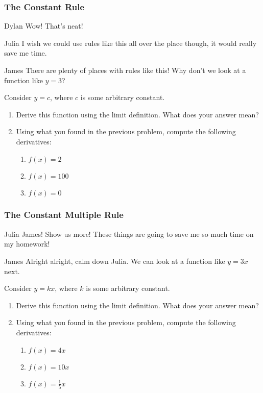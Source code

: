 \documentclass{ximera}
\begin{document}
\subsubsection{The Constant Rule}
\begin{dialogue}
\item[Dylan] Wow! That's neat!
\item[Julia] I wish we could use rules like this all over the place though, it would really save me time.
\item[James] There are plenty of places with rules like this! Why don't we look at a function like $y = 3$?
\end{dialogue}
Consider $y = c$, where $c$ is some arbitrary constant.
\begin{enumerate}
\item{Derive this function using the limit definition. What does your answer mean?}
\item{Using what you found in the previous problem, compute the following derivatives:
\begin{enumerate}
\item{$f(x)=2$}
\item{$f(x)=100$}
\item{$f(x)=0$}
\end{enumerate}
}
\end{enumerate}

\subsubsection{The Constant Multiple Rule}
\begin{dialogue}
\item[Julia] James! Show us more! These things are going to save me so much time on my homework!
\item[James] Alright alright, calm down Julia. We can look at a function like $y = 3x$ next.
\end{dialogue}

Consider $y = kx$, where $k$ is some arbitrary constant.
\begin{enumerate}
\item{Derive this function using the limit definition. What does your answer mean?}
\item{Using what you found in the previous problem, compute the following derivatives:
\begin{enumerate}
\item{$f(x)=4x$}
\item{$f(x)=10x$}
\item{$f(x)=\frac{1}{5}x$}
\end{enumerate}
}
\end{enumerate}
\end{document}
